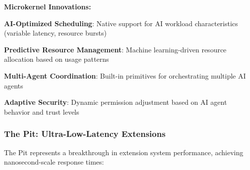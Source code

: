 \textbf{Microkernel Innovations:}

\begin{expandedlist}
    \item \textbf{AI-Optimized Scheduling}: Native support for AI workload characteristics (variable latency, resource bursts)
    
    \item \textbf{Predictive Resource Management}: Machine learning-driven resource allocation based on usage patterns
    
    \item \textbf{Multi-Agent Coordination}: Built-in primitives for orchestrating multiple AI agents
    
    \item \textbf{Adaptive Security}: Dynamic permission adjustment based on AI agent behavior and trust levels
\end{expandedlist}

\subsubsection{The Pit: Ultra-Low-Latency Extensions}

The Pit represents a breakthrough in extension system performance, achieving nanosecond-scale response times:

